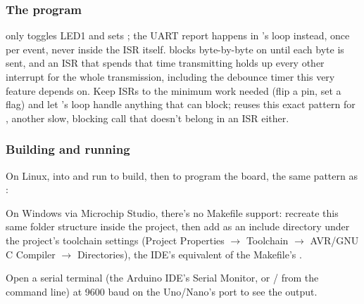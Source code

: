\subsubsection{The program}

\noindent{} only toggles LED1 and sets ; the UART report
happens in 's loop instead, once per event, never inside the ISR itself.
 blocks byte-by-byte on  until each byte is sent, and an ISR that
spends that time transmitting holds up every other interrupt for the whole transmission, including
the debounce timer this very feature depends on. Keep ISRs to the minimum work needed (flip a pin,
set a flag) and let 's loop handle anything that can block;  reuses
this exact pattern for , another slow, blocking call that doesn't belong in an
ISR either.

\subsubsection{Building and running}
\label{c6:sec:build}
On Linux,  into  and run  to build, then
 to program the board, the same  pattern as :


\noindent On Windows via Microchip Studio, there's no Makefile support: recreate this same folder
structure inside the project, then add  as an include directory under the project's
toolchain settings (Project Properties $\rightarrow$ Toolchain $\rightarrow$ AVR/GNU C Compiler
$\rightarrow$ Directories), the IDE's equivalent of the Makefile's .

Open a serial terminal (the Arduino IDE's Serial Monitor, or / from the
command line) at 9600 baud on the Uno/Nano's port to see the output.

